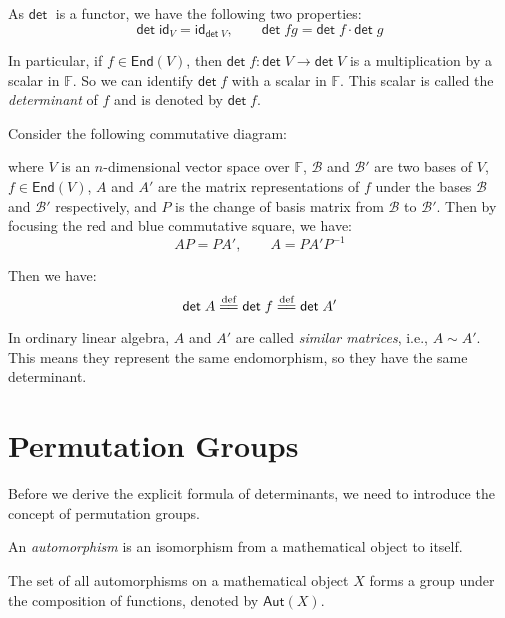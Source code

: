 \documentclass[
	11pt, %
	fleqn, %
	a4paper, %
]{LegrandOrangeBook}
\newcommand{\End}[1]{\mathsf{End}(#1)} %
\newcommand{\F}{\mathbb{F}} %
\newcommand{\id}{\mathsf{id}} %
\newcommand{\B}{\mathcal{B}} %
\renewcommand{\det}{\mathsf{det\;}} %
\newcommand{\Aut}{\mathsf{Aut}} %
\begin{document}
As $\det$ is a functor, we have the following two properties:
\[
    \det \id_V = \id_{\det V}, \qquad \det fg = \det f \cdot \det g
\]

In particular, if $f \in \End{V}$, then $\det f : \det V \to \det V$ is a multiplication by a scalar in $\F$. So we can identify $\det f$ with a scalar in $\F$. This scalar is called the \emph{determinant} of $f$ and is denoted by $\det f$.

Consider the following commutative diagram:
\begin{center}
\end{center}
where $V$ is an $n$-dimensional vector space over $\F$, $\B$ and $\B'$ are two bases of $V$, $f \in \End{V}$, $A$ and $A'$ are the matrix representations of $f$ under the bases $\B$ and $\B'$ respectively, and $P$ is the change of basis matrix from $\B$ to $\B'$. Then by focusing the red and blue commutative square, we have:
\[
    AP = PA', \qquad A = P A' P^{-1}
\]

Then we have:
\[
    \det A \overset{\text{def}}{=\joinrel=} \det f  \overset{\text{def}}{=\joinrel=} \det A'
\]

In ordinary linear algebra, $A$ and $A'$ are called \emph{similar matrices}, i.e., $A \sim A'$. This means they represent the same endomorphism, so they have the same determinant.

\newpage

\section{Permutation Groups}

Before we derive the explicit formula of determinants, we need to introduce the concept of permutation groups.

\begin{definition}[Automorphisms]
    An \emph{automorphism} is an isomorphism from a mathematical object to itself.
\end{definition}

\begin{definition}
    The set of all automorphisms on a mathematical object $X$ forms a group under the composition of functions, denoted by $\Aut(X)$.
\end{definition}
\end{document}
